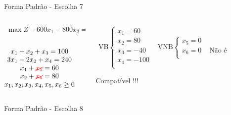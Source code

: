 \documentclass{beamer}
\begin{document}
\begin{frame}
{\begin{block}{Forma Padrão - {\color{cyan}Escolha 7}}
			\begin{columns}
				\begin{column}{0.35\textwidth}
					$
						\begin{matrix}
							\max Z - 600x_1 - 800x_2 = 0 \\
						\end{matrix}
					$ \\
					 \\
					$
						\begin{matrix}
							x_1  + x_2  + x_3                   = 100 \\
							3x_1 + 2x_2       + x_4             = 240 \\
							x_1                     + {\color{red}\cancel{x_5}}       = 60 \\
							x_2                           + {\color{red}\cancel{x_6}} = 80 \\
							x_1,x_2, x_3, x_4, x_5, x_6 \ge 0 \\
						\end{matrix}
					$
				\end{column}
				\vline
				\hspace{0.1cm}
				\begin{column}{0.45\textwidth}
						$
							\begin{matrix}
								\text{VB} \left\{  \begin{matrix}
																 x_1 = 60 \\
																 x_2 = 80 \\
																 x_3 = -40 \\
																 x_4 = -100 \\
												   \end{matrix} 
										   \right.
								&
								\text{VNB} \left\{  \begin{matrix}
																 x_5 = 0 \\
																 x_6 = 0 \\
												   \end{matrix} 
										   \right. 
								\\
							 & \\
							\end{matrix}
						$
						{\color{red}Não é Compatível !!!}
				\end{column}
			\end{columns}
		\end{block}
	}
	{
		\begin{block}{Forma Padrão - {\color{cyan}Escolha 8}}

\end{block}}
\end{frame}
\end{document}
